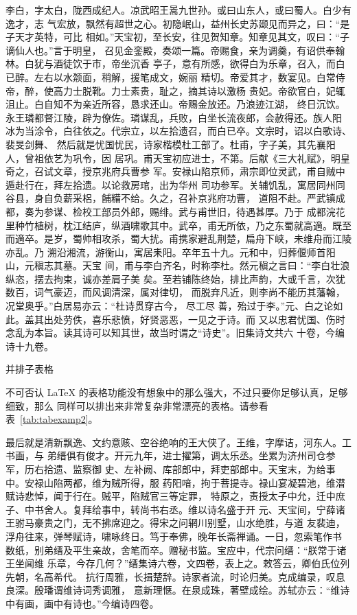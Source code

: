 李白，字太白，陇西成纪人。凉武昭王暠九世孙。或曰山东人，或曰蜀人。白少有逸才，志
气宏放，飘然有超世之心。初隐岷山，益州长史苏颋见而异之，曰：“是子天才英特，可比
相如。”天宝初，至长安，往见贺知章。知章见其文，叹曰：“子谪仙人也。”言于明皇，
召见金銮殿，奏颂一篇。帝赐食，亲为调羹，有诏供奉翰林。白犹与酒徒饮于市，帝坐沉香
亭子，意有所感，欲得白为乐章，召入，而白已醉。左右以水颒面，稍解，援笔成文，婉丽
精切。帝爱其才，数宴见。白常侍帝，醉，使高力士脱靴。力士素贵，耻之，摘其诗以激杨
贵妃。帝欲官白，妃辄沮止。白自知不为亲近所容，恳求还山。帝赐金放还。乃浪迹江湖，
终日沉饮。永王璘都督江陵，辟为僚佐。璘谋乱，兵败，白坐长流夜郎，会赦得还。族人阳
冰为当涂令，白往依之。代宗立，以左拾遗召，而白已卒。文宗时，诏以白歌诗、裴旻剑舞、
然后就是忧国忧民，诗家楷模杜工部了。杜甫，字子美，其先襄阳人，曾祖依艺为巩令，因
居巩。甫天宝初应进士，不第。后献《三大礼赋》，明皇奇之，召试文章，授京兆府兵曹参
军。安禄山陷京师，肃宗即位灵武，甫自贼中遁赴行在，拜左拾遗。以论救房琯，出为华州
司功参军。关辅饥乱，寓居同州同谷县，身自负薪采梠，餔糒不给。久之，召补京兆府功曹，
道阻不赴。严武镇成都，奏为参谋、检校工部员外郎，赐绯。武与甫世旧，待遇甚厚。乃于
成都浣花里种竹植树，枕江结庐，纵酒啸歌其中。武卒，甫无所依，乃之东蜀就高適。既至
而適卒。是岁，蜀帅相攻杀，蜀大扰。甫携家避乱荆楚，扁舟下峡，未维舟而江陵亦乱。乃
溯沿湘流，游衡山，寓居耒阳。卒年五十九。元和中，归葬偃师首阳山，元稹志其墓。天宝
间，甫与李白齐名，时称李杜。然元稹之言曰：“李白壮浪纵恣，摆去拘束，诚亦差肩子美
矣。至若铺陈终始，排比声韵，大或千言，次犹数百，词气豪迈，而风调清深，属对律切，
而脱弃凡近，则李尚不能历其藩翰，况堂奥乎。”白居易亦云：“杜诗贯穿古今，  尽工尽
善，殆过于李。”元、白之论如此。盖其出处劳佚，喜乐悲愤，好贤恶恶，一见之于诗。而
又以忠君忧国、伤时念乱为本旨。读其诗可以知其世，故当时谓之“诗史”。旧集诗文共六
十卷，今编诗十九卷。

\begin{table}[htbp]
\centering
\caption{并排子表格}
\label{tab:subtable}
\end{table}

不可否认 \LaTeX{} 的表格功能没有想象中的那么强大，不过只要你足够认真，足够细致，那么
同样可以排出来非常复杂非常漂亮的表格。请参看表~\ref{tab:tabexamp2}。

最后就是清新飘逸、文约意赅、空谷绝响的王大侠了。王维，字摩诘，河东人。工书画，与
弟缙俱有俊才。开元九年，进士擢第，调太乐丞。坐累为济州司仓参军，历右拾遗、监察御
史、左补阙、库部郎中，拜吏部郎中。天宝末，为给事中。安禄山陷两都，维为贼所得，服
药阳喑，拘于菩提寺。禄山宴凝碧池，维潜赋诗悲悼，闻于行在。贼平，陷贼官三等定罪，
特原之，责授太子中允，迁中庶子、中书舍人。复拜给事中，转尚书右丞。维以诗名盛于开
元、天宝间，宁薛诸王驸马豪贵之门，无不拂席迎之。得宋之问辋川别墅，山水绝胜，与道
友裴迪，浮舟往来，弹琴赋诗，啸咏终日。笃于奉佛，晚年长斋禅诵。一日，忽索笔作书
数纸，别弟缙及平生亲故，舍笔而卒。赠秘书监。宝应中，代宗问缙：“朕常于诸王坐闻维
乐章，今存几何？”缙集诗六卷，文四卷，表上之。敕答云，卿伯氏位列先朝，名高希代。
抗行周雅，长揖楚辞。诗家者流，时论归美。克成编录，叹息良深。殷璠谓维诗词秀调雅，
意新理惬。在泉成珠，著壁成绘。苏轼亦云：“维诗中有画，画中有诗也。”今编诗四卷。

